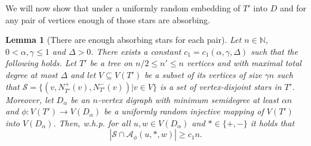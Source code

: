 \documentclass[10pt, a4paper]{article}
\newtheorem{lemma}[theorem]{Lemma}
\theoremstyle{remark}
\begin{document}
We will now show that under a uniformly random embedding of $T'$ into $D$ and for any pair of vertices enough of those stars are absorbing.

\begin{lemma}[There are enough absorbing stars for each pair]\label{lemma:enoughstars} 
    Let $n \in \mathbb{N}$, $0 < \alpha, \gamma \leq 1 $ and $\Delta > 0$. 
    There exists a constant $c_1 = c_1(\alpha, \gamma, \Delta)$ such that the following holds.
    Let $T'$ be a tree on $n/2 \leq n' \leq n$ vertices and with maximal total degree at most $\Delta$ and let $V \subseteq V(T')$ be a subset of its vertices of size $\gamma n$  such that $\mathcal{S} = \{ (v, N_{T'}^+(v), N_{T'}^-(v)) | v \in V\}$ is a set of vertex-disjoint stars in $T'$.
    Moreover, let $D_{\alpha}$ be an $n$-vertex digraph with minimum semidegree at least $\alpha n$ and $\phi: V(T') \to V(D_\alpha)$ be a uniformly random injective mapping of $V(T')$ into $V(D_\alpha)$.
    Then, w.h.p. for all $u,w \in V(D_\alpha)$ and $*\in \{+, - \}$ it holds that
    \[ |\mathcal{S} \cap \mathcal{A}_{\phi}(u, *, w)| \geq c_1 n. \]
\end{lemma}
\end{document}
